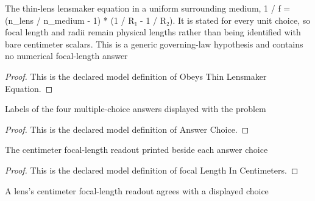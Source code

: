 \begin{definition}
  \label{def:physics:phyx-mini-0056:phyxminiproblems-problemphyxmini0056-obeysthinlensmakerequation}
  The thin-lens lensmaker equation in a uniform surrounding medium, 1 / f = (n\_lens / n\_medium - 1) * (1 / R₁ - 1 / R₂). It is stated for every unit choice, so focal length and radii remain physical lengths rather than being identified with bare centimeter scalars. This is a generic governing-law hypothesis and contains no numerical focal-length answer
\end{definition}
\begin{proof}
  This is the declared model definition of Obeys Thin Lensmaker Equation.
\end{proof}
\begin{definition}
  \label{def:physics:phyx-mini-0056:phyxminiproblems-problemphyxmini0056-answerchoice}
  Labels of the four multiple-choice answers displayed with the problem
\end{definition}
\begin{proof}
  This is the declared model definition of Answer Choice.
\end{proof}
\begin{definition}
  \label{def:physics:phyx-mini-0056:phyxminiproblems-problemphyxmini0056-answerchoice-focallengthincentimeters}
  The centimeter focal-length readout printed beside each answer choice
\end{definition}
\begin{proof}
  This is the declared model definition of focal Length In Centimeters.
\end{proof}
\begin{definition}
  \label{def:physics:phyx-mini-0056:phyxminiproblems-problemphyxmini0056-matchesanswerchoice}
  A lens's centimeter focal-length readout agrees with a displayed choice
\end{definition}
